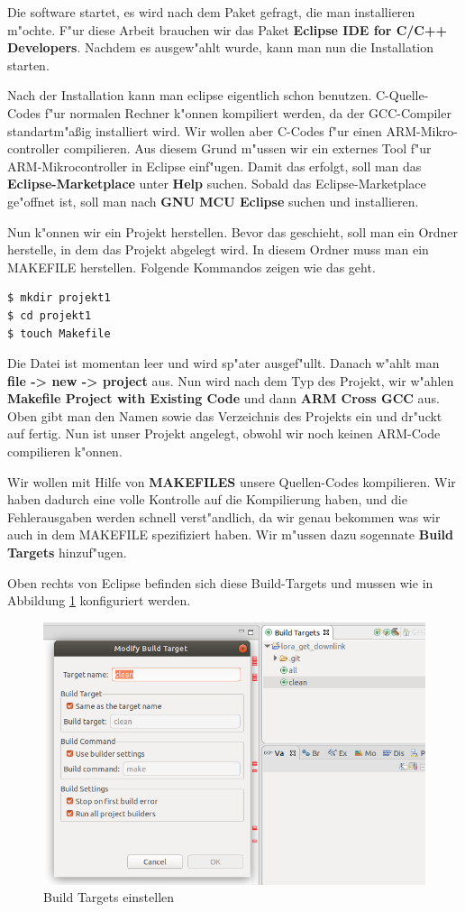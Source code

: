 Die software startet, es wird nach dem Paket gefragt, die man 
installieren m"ochte. F"ur diese Arbeit brauchen wir das Paket 
\textbf{Eclipse IDE for C/C++ Developers}. Nachdem es ausgew"ahlt 
wurde, kann man nun die Installation starten.
  
Nach der Installation kann man eclipse eigentlich schon benutzen. 
C-Quelle-Codes f"ur normalen Rechner k"onnen kompiliert werden, da der 
GCC-Compiler standartm"a\ss{}ig installiert wird. Wir wollen aber 
C-Codes f"ur einen ARM-Mikro- controller compilieren. Aus diesem Grund 
m"ussen wir ein externes Tool f"ur ARM-Mikrocontroller in Eclipse 
einf"ugen. Damit das erfolgt, soll man das \textbf{Eclipse-Marketplace} 
unter \textbf{Help} suchen. Sobald das Eclipse-Marketplace ge"offnet 
ist, soll man nach \textbf{GNU MCU Eclipse} suchen und installieren.

Nun k"onnen wir ein Projekt herstellen. Bevor das geschieht, soll man 
ein Ordner herstelle, in dem das Projekt abgelegt wird. In diesem 
Ordner muss man ein MAKEFILE herstellen. Folgende Kommandos zeigen wie 
das geht.
\begin{lstlisting}[frame=single]
$ mkdir projekt1
$ cd projekt1
$ touch Makefile
\end{lstlisting}
Die Datei ist momentan leer und wird sp"ater ausgef"ullt. Danach w"ahlt
man \textbf{file -> new -> project} aus. Nun wird nach dem Typ des 
Projekt, wir w"ahlen \textbf{Makefile Project with Existing Code} und 
dann \textbf{ARM Cross GCC} aus. Oben gibt man den Namen  sowie das
Verzeichnis des Projekts ein und dr"uckt auf fertig. Nun ist unser 
Projekt angelegt, obwohl wir noch keinen ARM-Code compilieren k"onnen.

Wir wollen mit Hilfe von \textbf{MAKEFILES} unsere Quellen-Codes 
kompilieren. Wir haben dadurch eine volle Kontrolle auf die 
Kompilierung haben, und die Fehlerausgaben werden schnell 
verst"andlich, da wir genau bekommen was wir auch in dem MAKEFILE 
spezifiziert haben. Wir m"ussen dazu sogennate \textbf{Build Targets} 
hinzuf"ugen. 

Oben rechts von Eclipse befinden sich diese Build-Targets und mussen wie in Abbildung \ref{fig:build} konfiguriert werden.

\begin{figure}[h]
	\centering
	\includegraphics[width=13cm]{source/images/Build}
	\caption{Build Targets einstellen\label{fig:build}}
\end{figure}

